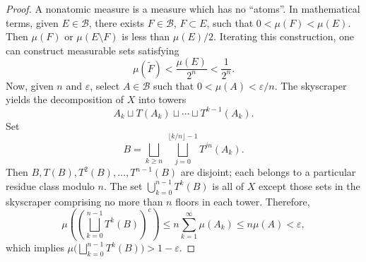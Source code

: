 \documentclass[11pt,a4paper]{article}
\begin{document}
\begin{proof}
A nonatomic measure is a measure which has no ``atoms''. In mathematical
terms, given $E\in\mathcal B$,
there exists $F\in\mathcal B$, $F\subset E$, such that $0<\mu(F)<\mu(E)$. Then $\mu(F)$ or
$\mu(E\setminus F)$ is less than $\mu(E)/2$. Iterating this construction, one
can construct
measurable sets satisfying
\[
 \mu(\widetilde F)<\frac{\mu(E)}{2^n}<\frac1{2^n}.
\]
Now, given $n$ and $\varepsilon$, select $A\in\mathcal B$ such that $0<\mu(A)<\varepsilon/n$. The skyscraper yields the decomposition of $X$ into towers
\[
 A_k\sqcup T(A_k)\sqcup\cdots\sqcup T^{k-1}(A_k).
\]
Set
\[
 B=\bigsqcup_{k\geq n}\ \bigsqcup_{j=0}^{\lfloor k/n\rfloor-1}T^{jn}(A_k).
\]
Then $B,T(B),T^2(B),\ldots,T^{n-1}(B)$ are disjoint; each belongs to a particular residue class modulo $n$. The set $\bigcup_{k=0}^{n-1}T^k(B)$ is all of $X$ except those sets in the skyscraper comprising no more than $n$ floors in each tower. Therefore,
\[
 \mu\left(\left(\bigsqcup_{k=0}^{n-1}T^k(B)\right)^c\right)
 \leq n\sum_{k=1}^{\infty}\mu(A_k)
 \leq n\mu(A)<\varepsilon,
\]
which implies $\mu\bigl(\bigsqcup_{k=0}^{n-1}T^k(B)\bigr)>1-\varepsilon$.
\end{proof}
\end{document}
